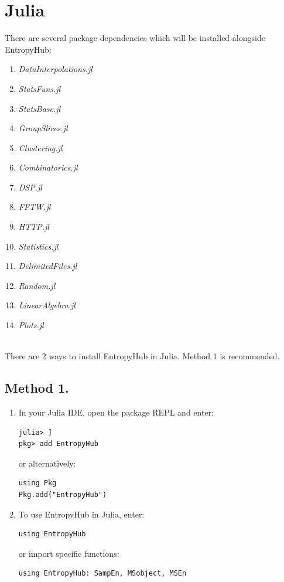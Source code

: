 \documentclass[12pt, a4paper, titlepage, openany]{book}
\begin{document}
\newpage
\section{\textbf{Julia}}
\noindent There are several package dependencies which will be installed alongside EntropyHub: 
\begin{enumerate}
\item[] \emph{DataInterpolations.jl}
\item[] \emph{StatsFuns.jl}
\item[] \emph{StatsBase.jl}
\item[] \emph{GroupSlices.jl}
\item[] \emph{Clustering.jl}
\item[] \emph{Combinatorics.jl}
\item[] \emph{DSP.jl}
\item[] \emph{FFTW.jl}
\item[] \emph{HTTP.jl}
\item[] \emph{Statistics.jl}
\item[] \emph{DelimitedFiles.jl}
\item[] \emph{Random.jl}
\item[] \emph{LinearAlgebra.jl}
\item[] \emph{Plots.jl}
\end{enumerate}  

\noindent \ \\
There are 2 ways to install EntropyHub in Julia. Method 1 is recommended.
\subsection*{\normalsize Method 1.}
\begin{enumerate}
\item  In your Julia IDE, open the package REPL and enter:
\begin{verbatim}
julia> ]
pkg> add EntropyHub
\end{verbatim}
or alternatively:
\begin{verbatim}
using Pkg
Pkg.add("EntropyHub")
\end{verbatim}
\item To use EntropyHub in Julia, enter:
\begin{verbatim}
using EntropyHub
\end{verbatim}
or import specific functions:
\begin{verbatim}
using EntropyHub: SampEn, MSobject, MSEn
\end{verbatim}
\end{enumerate}
\end{document}
